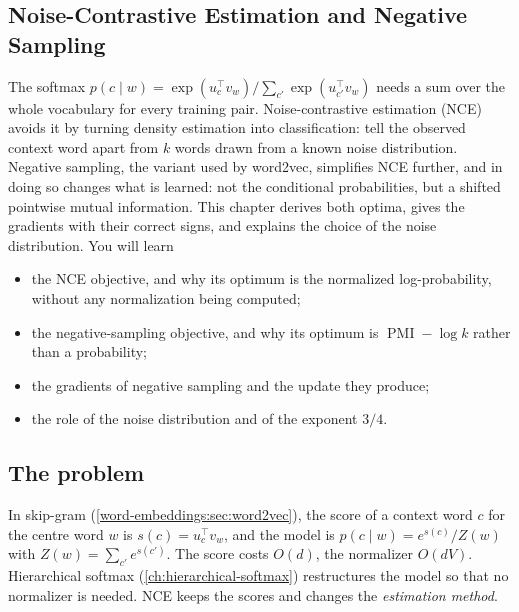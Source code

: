 \begin{notechapter}
\chapter{Noise-Contrastive Estimation and Negative Sampling}\label{ch:nce-negative-sampling}

\begin{chapterintro}
The softmax $p(c\mid w) = \exp(u_c^\top v_w)/\sum_{c'}\exp(u_{c'}^\top v_w)$ needs a sum over the whole vocabulary for every training
pair. Noise-contrastive estimation (NCE) avoids it by turning density estimation into
classification: tell the observed context word apart from $k$ words drawn from a known noise
distribution. Negative sampling, the variant used by word2vec, simplifies NCE further, and
in doing so changes what is learned: not the conditional probabilities, but a shifted
pointwise mutual information. This chapter derives both optima, gives the gradients with
their correct signs, and explains the choice of the noise distribution. You will learn
\begin{itemize}[nosep]
  \item the NCE objective, and why its optimum is the normalized log-probability, without any
        normalization being computed;
  \item the negative-sampling objective, and why its optimum is $\operatorname{PMI} - \log k$ rather than a probability;
  \item the gradients of negative sampling and the update they produce;
  \item the role of the noise distribution and of the exponent $3/4$.
\end{itemize}
\end{chapterintro}

\section{The problem}\label{nce-negative-sampling:sec:problem}

In skip-gram (\cref{word-embeddings:sec:word2vec}), the score of a context word $c$ for the centre word $w$ is
$s(c) = u_c^\top v_w$, and the model is $p(c\mid w) = e^{s(c)}/Z(w)$ with $Z(w) = \sum_{c'}e^{s(c')}$. The score costs $O(d)$, the normalizer
$O(dV)$. Hierarchical softmax (\cref{ch:hierarchical-softmax}) restructures the model so that no
normalizer is needed. NCE keeps the scores and changes the \emph{estimation method}.


\end{notechapter}
